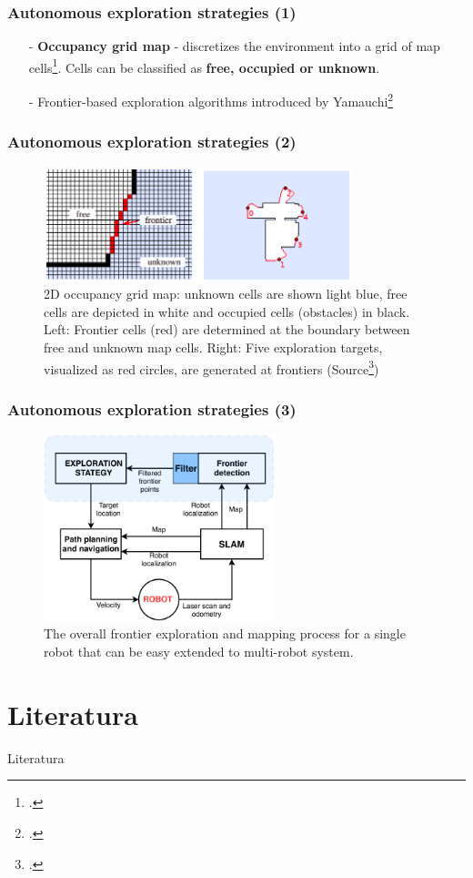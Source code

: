 \documentclass[aspectratio=43,mathserif]{beamer}
\begin{document}
\begin{frame}
	\frametitle{Autonomous exploration strategies (1)}
			\begin{itemize}
				\item[-] \textbf{Occupancy grid map} - discretizes the environment into a grid of map cells\footcite{Moravec}. Cells can be classified as \textbf{free, occupied or unknown}.
				\item[-] Frontier-based exploration algorithms introduced by Yamauchi\footcite{Yamauchi1997} 				
			\end{itemize}
\end{frame}

\begin{frame}
	\frametitle{Autonomous exploration strategies (2)}
	\begin{figure}
		\centering
		\includegraphics[width=0.8\textwidth]{figures/environment1}
		\caption{2D occupancy grid map: unknown cells are shown light blue, free cells are depicted in white and occupied cells (obstacles) in black. Left: Frontier cells (red) are determined at the boundary between free and unknown map cells. Right: Five exploration targets, visualized as red circles, are generated at frontiers (Source\footcite{Wurm2012})}
	\end{figure}
\end{frame}

\begin{frame}
	\frametitle{Autonomous exploration strategies (3)}
	\begin{figure}
		\centering
		\includegraphics[width=0.6\textwidth]{figures/strategy_one_robot}
		\caption{The overall frontier exploration and mapping process for a single robot that can be easy extended to multi-robot system.}
	\end{figure}
\end{frame}

\section*{Literatura}
\begin{frame}[allowframebreaks]{Literatura}
\printbibliography
\end{frame}
\end{document}
